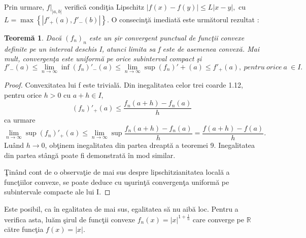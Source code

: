 \documentclass[a4paper,12pt,oneside]{report}
\newtheorem{theorem}{Teorem\u a}
\begin{document}
Prin urmare, \(f|_{\left | a,b \right |}\) verific\u{a} condi\c{t}ia Lipschitz \(\left | f\left ( x \right )  - f\left ( y \right )\right |\leq L\left | x-y \right |,\) cu \(L=\max \left \{ \left | {f}'_{+} \left ( a \right ),{f}'_{-} \left ( b \right ) \right | \right \}\). O consecin\c{t}\u{a} imediat\u{a} este urm\u{a}torul rezultat :

\begin{theorem}
Dac\u{a} \(\left ( f_{n} \right )_{n}\) este un \c{s}ir convergent punctual de func\c{t}ii convexe definite pe un interval deschis I, atunci limita sa f este de asemenea convex\u{a}. Mai mult, convergen\c{t}a este uniform\u{a} pe orice subinterval compact \c{s}i
\begin{displaymath}
   {f}'_{-}\left ( a \right ) \leq \lim_{n\rightarrow \infty } \inf {\left (f_{n}  \right )}'_{-}\left ( a \right )\leq \lim_{n\rightarrow \infty }\sup {\left (f_{n}  \right )}' + \left ( a \right ) \leq {f}'_{+}\left ( a \right ), ~pentru ~orice~ a~ \in I.
\end{displaymath}
\end{theorem}
\begin{proof}
Convexitatea lui f este trivial\u{a}. Din inegalitatea celor trei coarde 1.12, pentru orice \(h >  0\) cu \(a + h \in I\),
\begin{displaymath}
   {\left (f_{n}  \right )}'_{+}\left ( a \right ) \leq  \frac{f_{n}\left ( a + h \right ) - f_{n}\left ( a \right )}{h}
\end{displaymath}
ca urmare
\begin{displaymath}
   \lim_{n\rightarrow \infty } \sup {\left ( f_{n} \right )}'_{+}\left ( a \right ) \leq \lim_{n\rightarrow \infty } \sup \frac{f_{n}\left ( a + h \right ) - f_{n}\left ( a \right )}{h} = \frac{f\left ( a + h \right ) - f\left ( a \right )}{h}.
\end{displaymath}
Lu\^{a}nd \(h\rightarrow 0\), ob\c{t}inem inegalitatea din partea dreapt\u{a} a teoremei 9. Inegalitatea din partea st\^{a}ng\u{a} poate fi demonstrat\u{a} \^{i}n mod similar.

\c{T}in\^{a}nd cont de o observa\c{t}ie de mai sus despre lipschitzianitatea local\u{a} a  func\c{t}iilor convexe, se poate deduce cu u\c{s}urin\c{t}\u{a} convergen\c{t}a uniform\u{a} pe subintervale compacte ale lui I.
\end{proof}
Este posibil, ca \^{i}n egalitatea de mai sus, egalitatea s\u{a} nu aib\u{a} loc. Pentru a verifica asta, lu\u{a}m \c{s}irul de func\c{t}ii convexe \(f_{n}\left ( x \right ) = \left | x \right |^{1 + \frac{1}{n}}\) care converge pe \(\mathbb{R}\) c\u{a}tre func\c{t}ia \(f\left ( x  \right ) = \left | x \right |.\)
\end{document}
